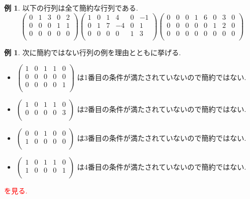 \documentclass[dvipdfmx,a4paper,11pt]{article} %
\newcommand{\xr}[1]{\textcolor{red}{#1}}
\theoremstyle{definition}
\newtheorem{exa}[thm]{例}
\begin{document}
 
 \begin{exa}
以下の行列は全て簡約な行列である.
$$
 \begin{pmatrix}
 0& 1& 3  & 0&2\\
 0& 0& 0  & 1&1\\
 0& 0& 0 & 0&0\\
 \end{pmatrix}
  \begin{pmatrix}
 1& 0& 1  & 4&0&-1\\
 0& 1& 7 & -4&0&1\\
 0& 0& 0 & 0&1&3\\
 \end{pmatrix}
   \begin{pmatrix}
 0& 0& 0  & 1&6&0&3&0\\
 0& 0& 0 & 0&0&1&2&0\\
 0& 0& 0 & 0&0&0&0&0 \\
 \end{pmatrix}
$$
\end{exa}
 \begin{exa}
 次に簡約ではない行列の例を理由とともに挙げる.
 \begin{itemize}
\item 
$ 
\begin{pmatrix}
 1& 0& 1  & 1&0\\
 0& 0& 0  & 0&0\\
 0& 0& 0 & 0&1\\
 \end{pmatrix} 
 $
 は1番目の条件が満たされていないので簡約ではない.
 \item 
$ 
\begin{pmatrix}
 1& 0& 1  & 1&0\\
 0& 0& 0  & 0&3\\
 \end{pmatrix} 
 $
 は2番目の条件が満たされていないので簡約ではない.
 \item 
$ 
\begin{pmatrix}
 0& 0& 1  & 0&0\\
 1& 0& 0  & 0&0\\
 \end{pmatrix} 
 $
 は3番目の条件が満たされていないので簡約ではない.
 \item 
$ 
\begin{pmatrix}
 1& 0& 1  & 1&0\\
 1& 0& 0  & 0&1\\
 \end{pmatrix} 
 $
 は4番目の条件が満たされていないので簡約ではない.
 \end{itemize}
\end{exa}
\xr{\cite[例 2.3.4]{O}を見る.}
 
\end{document}

